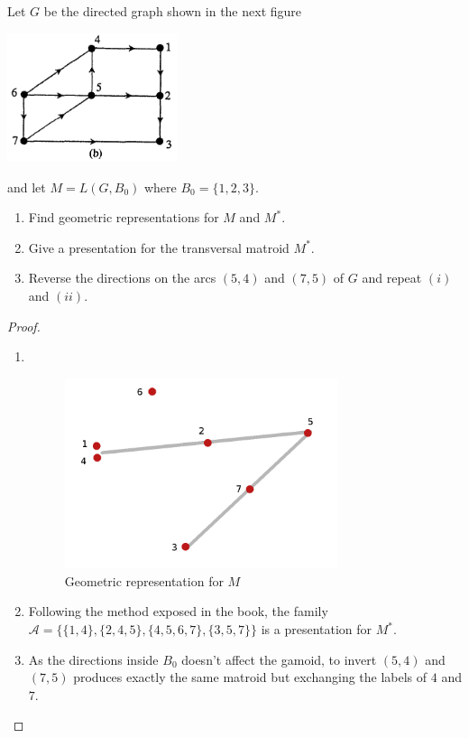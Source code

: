 \prob
{
    Let $G$ be the directed graph shown in the next figure 
		    \begin{center}
                \includegraphics[width=5cm]{Test2/Problem13/Figure2_17.png}
            \end{center}\pn
		and let $M = L(G, B_0)$ where $B_0 = \{1,2,3\}$. 
    \begin{enumerate}[label=(\roman*)]
        \item   Find geometric representations for $M$ and $M^*$.
        \item   Give a presentation for the transversal matroid $M^*$.
        \item   Reverse the directions on the arcs $(5,4)$ and $(7,5)$ of $G$
                and repeat $(i)$ and $(ii)$.
    \end{enumerate}
}
\begin{proof}
    \begin{enumerate}[label=(\roman*)]
        \item $\,$\pn
                 \begin{figure}[H]
                    \begin{center}
                        \includegraphics[width=8cm]{Test2/Problem13/GraphicRepresentationM.png}
                    \end{center}                            
                    \caption{Geometric representation for $M$}
                    \label{t2:p13_GraphicRepresentationM.png}                        
                \end{figure}\pn    
                
        \item  Following the method exposed in the book, the family $\mathcal{A} = \{\{1, 4\}, \{2, 4, 5\}, \{4, 5, 6, 7\}, \{3, 5, 7\}\}$
                is a presentation for $M^*$.
                
        \item As the directions inside $B_0$ doesn't affect the gamoid, to invert $(5,4)$ and $(7,5)$
                produces exactly the same matroid but exchanging the labels of $4$ and $7$.\pn
    \end{enumerate}
\end{proof}